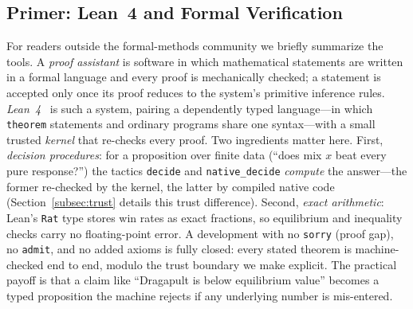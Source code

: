 \documentclass[journal]{IEEEtran}
\newif\ifhighlightchanges
\newcommand{\revised}[1]{\ifhighlightchanges\textcolor{blue!70!black}{#1}\else#1\fi}
\let\origsubsection\subsection
\renewcommand{\subsection}{\needspace{3\baselineskip}\origsubsection}
\begin{document}
\revised{\subsection{Primer: Lean~4 and Formal Verification}
For readers outside the formal-methods community we briefly summarize the tools.
A \emph{proof assistant} is software in which mathematical statements are written in a formal language and every proof is mechanically checked; a statement is accepted only once its proof reduces to the system's primitive inference rules.
\emph{Lean~4}~\cite{moura2021lean} is such a system, pairing a dependently typed language---in which \texttt{theorem} statements and ordinary programs share one syntax---with a small trusted \emph{kernel} that re-checks every proof.
Two ingredients matter here.
First, \emph{decision procedures}: for a proposition over finite data (``does mix $x$ beat every pure response?'') the tactics \texttt{decide} and \texttt{native\_decide} \emph{compute} the answer---the former re-checked by the kernel, the latter by compiled native code (Section~\ref{subsec:trust} details this trust difference).
Second, \emph{exact arithmetic}: Lean's \texttt{Rat} type stores win rates as exact fractions, so equilibrium and inequality checks carry no floating-point error.
A development with no \texttt{sorry} (proof gap), no \texttt{admit}, and no added axioms is fully closed: every stated theorem is machine-checked end to end, modulo the trust boundary we make explicit.
The practical payoff is that a claim like ``Dragapult is below equilibrium value'' becomes a typed proposition the machine rejects if any underlying number is mis-entered.}
\end{document}

